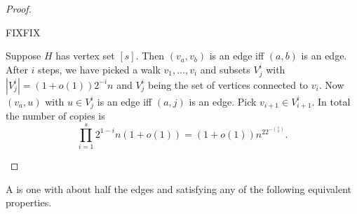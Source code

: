 \begin{proof}
\begin{enumerate}
FIXFIX

Suppose $H$ has vertex set $[s]$. Then $(v_a,v_b)$ is an edge iff $(a,b)$ is an edge. 
After $i$ steps,  we have picked a walk $v_1,\ldots, v_i$ and subsets $V^i_j$  %
with $|V^i_j|=(1+o(1))2^{-i}n$ and $V^i_j$ being the set of vertices connected to $v_i$.
Now $(v_a,u)$ with $u\in V^i_j$ is an edge iff $(a,j)$ is an edge. Pick $v_{i+1}\in V_{i+1}^i$. 
In total the number of copies is
\[
\prod_{i=1}^s 2^{1-i} n(1+o(1))=(1+o(1))n^22^{-\binom s2}.
\]
\end{enumerate}
\end{proof}
\begin{df}
A  is one with about half the edges and satisfying any of the following equivalent properties.
\end{df}